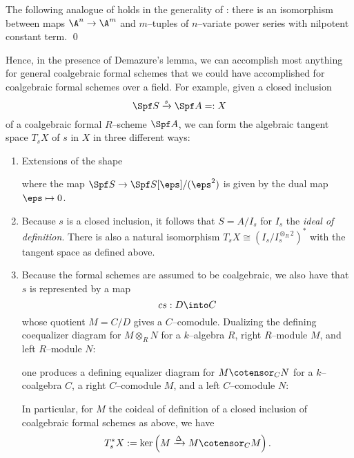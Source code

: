 \begin{lemma}\label{MapsOfAffineSpaces}
The following analogue of  holds in the generality of : there is an isomorphism between maps $\A^n \to \A^m$ and $m$--tuples of $n$--variate power series with nilpotent constant term. \qed
\end{lemma}

Hence, in the presence of Demazure's lemma, we can accomplish most anything for general coalgebraic formal schemes that we could have accomplished for coalgebraic formal schemes over a field.  For example, given a closed inclusion \[\Spf S \xrightarrow{s} \Spf A =: X\] of a coalgebraic formal $R$--scheme $\Spf A$, we can form the algebraic tangent space $T_s X$ of $s$ in $X$ in three different ways:
\begin{enumerate}
\item Extensions of the shape
\begin{center}
\end{center}
where the map $\Spf S \to \Spf S[\eps] / (\eps^2)$ is given by the dual map $\eps \mapsto 0$.
\item Because $s$ is a closed inclusion, it follows that $S = A / I_s$ for $I_s$ the \textit{ideal of definition}.  There is also a natural isomorphism $T_s X \cong (I_s / I_s^{\otimes_R 2})^*$ with the tangent space as defined above.
\item Because the formal schemes are assumed to be coalgebraic, we also have that $s$ is represented by a map \[c s: D \into C\] whose quotient $M = C / D$ gives a $C$--comodule.  Dualizing the defining coequalizer diagram for $M \otimes_R N$ for a $k$--algebra $R$, right $R$--module $M$, and left $R$--module $N$:
\begin{center}
\end{center}
one produces a defining equalizer diagram for $M \cotensor_C N$ for a $k$--coalgebra $C$, a right $C$--comodule $M$, and a left $C$--comodule $N$:
\begin{center}
\end{center}
In particular, for $M$ the coideal of definition of a closed inclusion of coalgebraic formal schemes as above, we have \[T^*_s X := \ker\left( M \xrightarrow{\Delta} M \cotensor_C M \right).\]
\end{enumerate}

